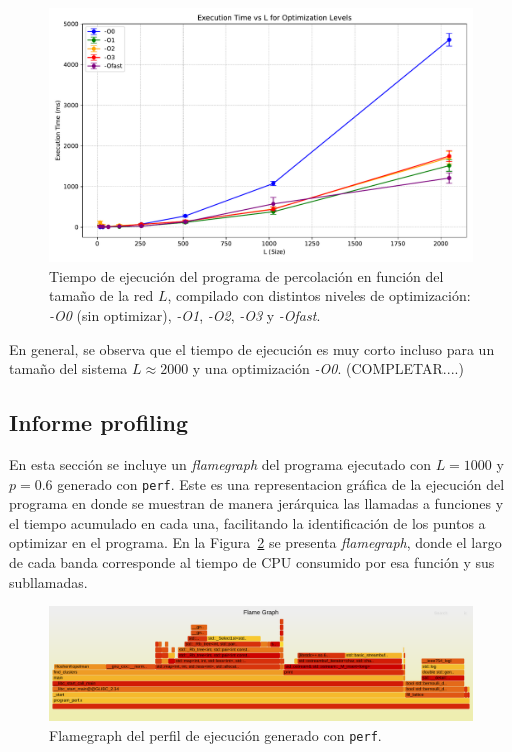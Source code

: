 \documentclass{article}
\begin{document}
\begin{figure}[h]
    \centering
    \includegraphics[width=1.0\textwidth]{figures/opti_comparison.pdf}
    \caption{Tiempo de ejecución del programa de percolación en función del tamaño de la red \(L\), compilado con distintos niveles de optimización: \textit{-O0} (sin optimizar), \textit{-O1}, \textit{-O2}, \textit{-O3} y \textit{-Ofast}.}
    \label{fig:opt_levels}
\end{figure}

En general, se observa que el tiempo de ejecución es muy corto incluso para un tamaño del sistema \(L \approx 2000\) y una optimización \textit{-O0}. (COMPLETAR....)

\subsection{Informe profiling}

En esta sección se incluye un \textit{flamegraph} del programa ejecutado con \(L = 1000\) y \(p = 0.6\) generado con \texttt{perf}. Este es una representacion gráfica de la ejecución del programa en donde se muestran de manera jerárquica las llamadas a funciones y el tiempo acumulado en cada una, facilitando la identificación de los puntos a optimizar en el programa. En la Figura~\ref{fig:flamegraph} se presenta \textit{flamegraph}, donde el largo de cada banda corresponde al tiempo de CPU consumido por esa función y sus subllamadas. 

\begin{figure}[h]
    \centering
    \includegraphics[width=1.0\textwidth]{figures/flamegraph.pdf}
    \caption{Flamegraph del perfil de ejecución generado con \texttt{perf}.}
    \label{fig:flamegraph}
\end{figure}
\end{document}
